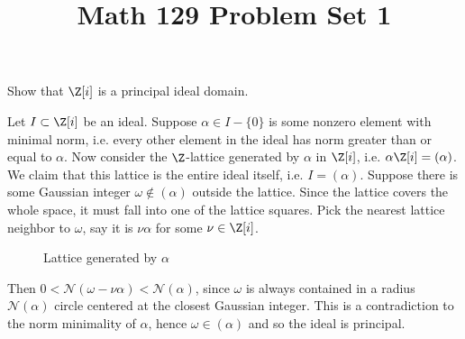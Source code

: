 \documentclass[11pt,letterpaper]{article}
\title{\textbf{Math 129 Problem Set 1}}
\begin{document}
\maketitle

\begin{cproblem}{1.7}
  Show that $\Z[i]$ is a principal ideal domain. 
\end{cproblem}

\begin{solution}
  Let $I\subset \Z[i]$ be an ideal. Suppose $\alpha\in I-\{0\}$ is some nonzero element with minimal norm, i.e. every other element in the ideal has norm greater than or equal to $\alpha$. Now consider the $\Z$-lattice generated by $\alpha$ in $\Z[i]$, i.e. $\alpha\Z[i]=(\alpha)$. We claim that this lattice is the entire ideal itself, i.e. $I=(\alpha)$. Suppose there is some Gaussian integer $\omega\not\in (\alpha)$ outside the lattice. Since the lattice covers the whole space, it must fall into one of the lattice squares. Pick the nearest lattice neighbor to $\omega$, say it is $\nu\alpha$ for some $\nu\in \Z[i]$.  
  \begin{figure}[ht]
    \centering
    \caption{Lattice generated by $\alpha$} 
  \end{figure}
  
  Then $0<\mathcal{N}(\omega-\nu \alpha) < \mathcal{N}(\alpha)$, since $\omega$ is always contained in a radius $\mathcal{N}(\alpha)$ circle centered at the closest Gaussian integer. This is a contradiction to the norm minimality of $\alpha$, hence $\omega\in (\alpha)$ and so the ideal is principal.  
\end{solution}
\end{document}
